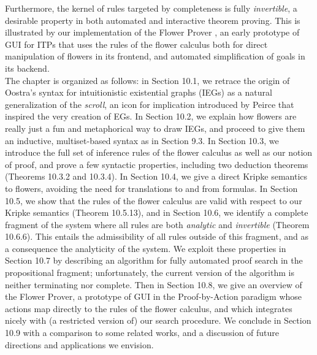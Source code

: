 \documentclass[11pt]{article}
\begin{document}
Furthermore, the kernel of rules targeted by completeness is fully
\emph{invertible}, a desirable property in both automated and interactive theorem proving. This is illustrated by our implementation of the Flower\,\,Prover \cite{flower-prover},
an early prototype of GUI for ITPs that uses the rules of the flower
calculus both for direct manipulation of flowers in its frontend, and
automated simplification of goals in its backend.
\\

The chapter is organized as follows: in Section 10.1, we retrace the origin of Oostra's syntax for
intuitionistic existential graphs (IEGs) as a natural generalization of the \emph{scroll}, an icon
for implication introduced by Peirce that inspired the very creation of EGs. In Section 10.2, we
explain how flowers are really just a fun and metaphorical way to draw IEGs, and proceed to give
them an inductive, multiset-based syntax as in Section 9.3. In Section 10.3, we introduce the full
set of inference rules of the flower calculus as well as our notion of proof, and prove a few
syntactic properties, including two deduction theorems (Theorems 10.3.2 and 10.3.4). In Section
10.4, we give a direct Kripke semantics to flowers, avoiding the need for translations to and from
formulas. In Section 10.5, we show that the rules of the flower calculus are valid with respect to
our Kripke semantics (Theorem 10.5.13), and in Section 10.6, we identify a complete fragment of the
system where all rules are both \emph{analytic} and \emph{invertible} (Theorem 10.6.6). This entails
the admissibility of all rules outside of this fragment, and as a consequence the analyticity of the
system. We exploit these properties in Section 10.7 by describing an algorithm for fully automated
proof search in the propositional fragment; unfortunately, the current version of the algorithm is
neither terminating nor complete. Then in Section 10.8, we give an overview of the Flower\,\,Prover,
a prototype of GUI in the Proof-by-Action paradigm whose actions map directly to the rules of the
flower calculus, and which integrates nicely with (a restricted version of) our search procedure. We
conclude in Section 10.9 with a comparison to some related works, and a discussion of future
directions and applications we envision.

\printbibliography
\end{document}
